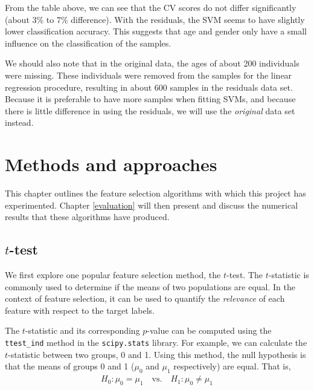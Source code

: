 \documentclass[12pt, twoside, a4paper]{report}
\begin{document}
From the table above, we can see that the CV scores do not differ significantly (about 3\% to 7\% difference). With the residuals, the SVM seems to have slightly lower classification accuracy. This suggests that age and gender only have a small influence on the classification of the samples.

We should also note that in the original data, the ages of about 200 individuals were missing. These individuals were removed from the samples for the linear regression procedure, resulting in about 600 samples in the residuals data set. Because it is preferable to have more samples when fitting SVMs, and because there is little difference in using the residuals, we will use the \textit{original} data set instead.




\chapter{Methods and approaches}
\label{methods}

This chapter outlines the feature selection algorithms with which this project has experimented. Chapter \ref{evaluation} will then present and discuss the numerical results that these algorithms have produced. 

\section{$t$-test} \label{t-test}

We first explore one popular feature selection method, the $t$-test. The $t$-statistic is commonly used to determine if the means of two populations are equal. In the context of feature selection, it can be used to quantify the \textit{relevance} of each feature with respect to the target labels.

The $t$-statistic and its corresponding $p$-value can be computed using the \texttt{ttest\_ind} method in the \texttt{scipy.stats} \cite{scipy} library. For example, we can calculate the $t$-statistic between two groups, 0 and 1. Using this method, the null hypothesis is that the means of groups 0 and 1 ($\mu_0$ and $\mu_1$ respectively) are equal. That is,
\begin{align*}
H_0: \mu_0 = \mu_1 \quad \text{vs.} \quad H_1: \mu_0 \neq \mu_1
\end{align*}
\end{document}
